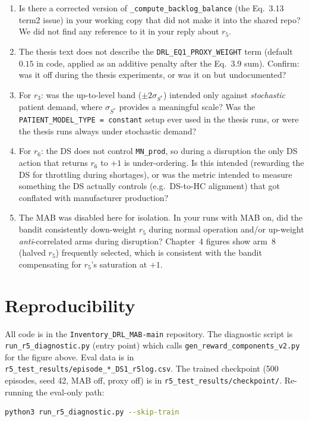 \documentclass[11pt,letterpaper]{article}
\newcommand{\code}[1]{\texttt{\small #1}}
\begin{document}
\begin{enumerate}
  \item Is there a corrected version of \code{\_compute\_backlog\_balance} (the Eq.~3.13 term2 issue) in your working copy that did not make it into the shared repo?  We did not find any reference to it in your reply about $r_5$.
  \item The thesis text does not describe the \code{DRL\_EQ1\_PROXY\_WEIGHT} term (default $0.15$ in code, applied as an additive penalty after the Eq.~3.9 sum).  Confirm: was it off during the thesis experiments, or was it on but undocumented?
  \item For $r_3$: was the up-to-level band ($\pm 2\sigma_{S^*}$) intended only against \emph{stochastic} patient demand, where $\sigma_{S^*}$ provides a meaningful scale?  Was the \code{PATIENT\_MODEL\_TYPE = constant} setup ever used in the thesis runs, or were the thesis runs always under stochastic demand?
  \item For $r_6$: the DS does not control \code{MN\_prod}, so during a disruption the only DS action that returns $r_6$ to $+1$ is under-ordering.  Is this intended (rewarding the DS for throttling during shortages), or was the metric intended to measure something the DS actually controls (e.g.\ DS-to-HC alignment) that got conflated with manufacturer production?
  \item The MAB was disabled here for isolation.  In your runs with MAB on, did the bandit consistently down-weight $r_5$ during normal operation and/or up-weight \emph{anti}-correlated arms during disruption?  Chapter~4 figures show arm~8 (halved $r_5$) frequently selected, which is consistent with the bandit compensating for $r_5$'s saturation at $+1$.
\end{enumerate}

\section*{Reproducibility}

All code is in the \code{Inventory\_DRL\_MAB-main} repository.  The diagnostic script is \code{run\_r5\_diagnostic.py} (entry point) which calls \code{gen\_reward\_components\_v2.py} for the figure above.  Eval data is in \code{r5\_test\_results/episode\_*\_DS1\_r5log.csv}.  The trained checkpoint (500 episodes, seed 42, MAB off, proxy off) is in \code{r5\_test\_results/checkpoint/}.  Re-running the eval-only path:
\begin{lstlisting}[language=bash]
python3 run_r5_diagnostic.py --skip-train
\end{lstlisting}
\end{document}
